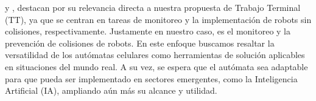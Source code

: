         y \cite{Lopes2023}, destacan por su relevancia directa a nuestra propuesta de Trabajo Terminal (TT), 
        ya que se centran en tareas de monitoreo y la implementaci\'on de robots sin colisiones, respectivamente. 
        Justamente en nuestro caso, es el monitoreo y la prevenci\'on de colisiones de robots.
    \vskip 0.5cm
    En este enfoque buscamos resaltar la versatilidad de los aut\'omatas celulares como herramientas de soluci\'on aplicables 
        en situaciones del mundo real. A su vez, se espera que el aut\'omata sea adaptable para que pueda ser implementado 
        en sectores emergentes, como la Inteligencia Artificial (IA), ampliando a\'un m\'as su alcance y utilidad.
    
    
\clearpage